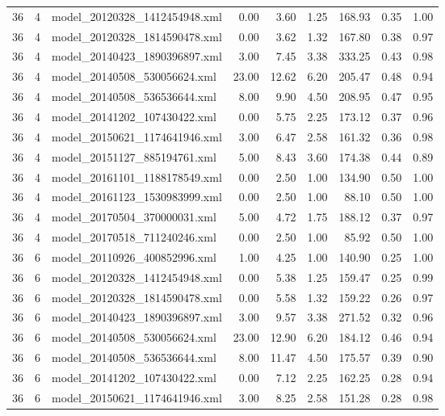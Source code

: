 \begin{table}[ht]
\begin{tabular}{rrlrrrrrr}
   36 &   4 & model\_20120328\_1412454948.xml & 0.00 & 3.60 & 1.25 & 168.93 & 0.35 & 1.00 \\ 
   36 &   4 & model\_20120328\_1814590478.xml & 0.00 & 3.62 & 1.32 & 167.80 & 0.38 & 0.97 \\ 
   36 &   4 & model\_20140423\_1890396897.xml & 3.00 & 7.45 & 3.38 & 333.25 & 0.43 & 0.98 \\ 
   36 &   4 & model\_20140508\_530056624.xml & 23.00 & 12.62 & 6.20 & 205.47 & 0.48 & 0.94 \\ 
   36 &   4 & model\_20140508\_536536644.xml & 8.00 & 9.90 & 4.50 & 208.95 & 0.47 & 0.95 \\ 
   36 &   4 & model\_20141202\_107430422.xml & 0.00 & 5.75 & 2.25 & 173.12 & 0.37 & 0.96 \\ 
   36 &   4 & model\_20150621\_1174641946.xml & 3.00 & 6.47 & 2.58 & 161.32 & 0.36 & 0.98 \\ 
   36 &   4 & model\_20151127\_885194761.xml & 5.00 & 8.43 & 3.60 & 174.38 & 0.44 & 0.89 \\ 
   36 &   4 & model\_20161101\_1188178549.xml & 0.00 & 2.50 & 1.00 & 134.90 & 0.50 & 1.00 \\ 
   36 &   4 & model\_20161123\_1530983999.xml & 0.00 & 2.50 & 1.00 & 88.10 & 0.50 & 1.00 \\ 
   36 &   4 & model\_20170504\_370000031.xml & 5.00 & 4.72 & 1.75 & 188.12 & 0.37 & 0.97 \\ 
   36 &   4 & model\_20170518\_711240246.xml & 0.00 & 2.50 & 1.00 & 85.92 & 0.50 & 1.00 \\ 
   36 &   6 & model\_20110926\_400852996.xml & 1.00 & 4.25 & 1.00 & 140.90 & 0.25 & 1.00 \\ 
   36 &   6 & model\_20120328\_1412454948.xml & 0.00 & 5.38 & 1.25 & 159.47 & 0.25 & 0.99 \\ 
   36 &   6 & model\_20120328\_1814590478.xml & 0.00 & 5.58 & 1.32 & 159.22 & 0.26 & 0.97 \\ 
   36 &   6 & model\_20140423\_1890396897.xml & 3.00 & 9.57 & 3.38 & 271.52 & 0.32 & 0.96 \\ 
   36 &   6 & model\_20140508\_530056624.xml & 23.00 & 12.90 & 6.20 & 184.12 & 0.46 & 0.94 \\ 
   36 &   6 & model\_20140508\_536536644.xml & 8.00 & 11.47 & 4.50 & 175.57 & 0.39 & 0.90 \\ 
   36 &   6 & model\_20141202\_107430422.xml & 0.00 & 7.12 & 2.25 & 162.25 & 0.28 & 0.94 \\ 
   36 &   6 & model\_20150621\_1174641946.xml & 3.00 & 8.25 & 2.58 & 151.28 & 0.28 & 0.98 \\ 

\end{tabular}
\end{table}
